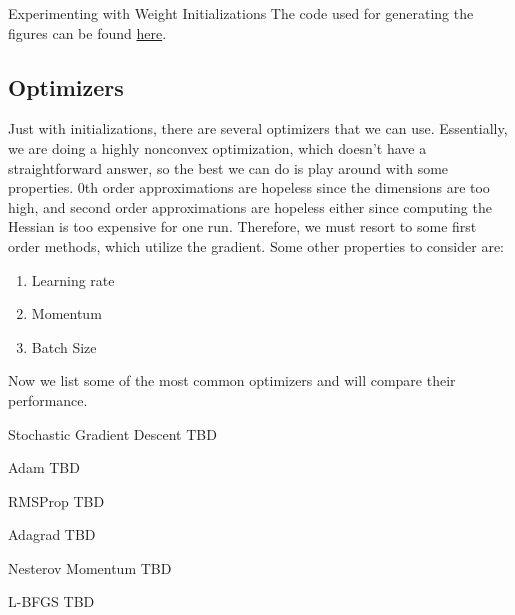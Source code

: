 \documentclass{article}
\begin{document}
    \begin{code}{Experimenting with Weight Initializations} 
      The code used for generating the figures can be found \href{code/initialization.ipynb}{here}. 
    \end{code}
    
  \subsection{Optimizers}

    Just with initializations, there are several optimizers that we can use. Essentially, we are doing a highly nonconvex optimization, which doesn't have a straightforward answer, so the best we can do is play around with some properties. 0th order approximations are hopeless since the dimensions are too high, and second order approximations are hopeless either since computing the Hessian is too expensive for one run. Therefore, we must resort to some first order methods, which utilize the gradient. Some other properties to consider are: 
    \begin{enumerate} 
      \item Learning rate 
      \item Momentum 
      \item Batch Size
    \end{enumerate}

    Now we list some of the most common optimizers and will compare their performance. 

    \begin{definition}{Stochastic Gradient Descent}
      TBD
    \end{definition}

    \begin{definition}{Adam}
      TBD
    \end{definition}

    \begin{definition}{RMSProp}
      TBD
    \end{definition}

    \begin{definition}{Adagrad}
      TBD
    \end{definition}

    \begin{definition}{Nesterov Momentum}
      TBD
    \end{definition}

    \begin{definition}{L-BFGS}
      TBD
    \end{definition}
\end{document}
